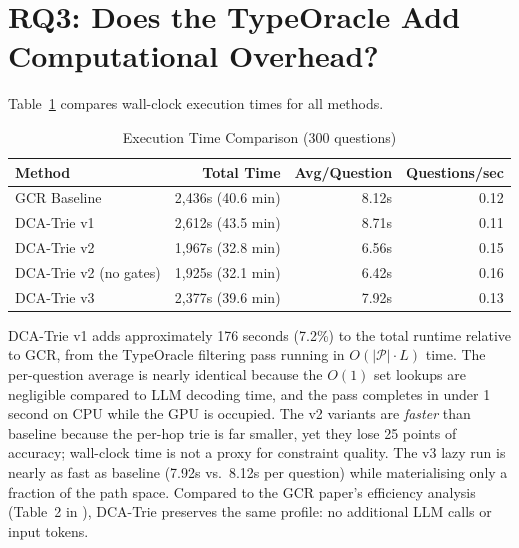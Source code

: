 \section{RQ3: Does the TypeOracle Add Computational Overhead?}
\label{sec:ch4timing}

Table~\ref{tab:timing} compares wall-clock execution times for all methods.

\begin{table}[H]
  \centering
  \caption[Execution Time by Method]{Execution Time Comparison (300 questions)}
  \label{tab:timing}
  \begin{tabularx}{\textwidth}{|X|r|r|r|}
    \hline
    \textbf{Method} & \textbf{Total Time} & \textbf{Avg/Question} & \textbf{Questions/sec} \\
    \hline
    GCR Baseline    & 2,436s (40.6 min)   & 8.12s                 & 0.12                   \\
    \hline
    DCA-Trie v1     & 2,612s (43.5 min)   & 8.71s                 & 0.11                   \\
    \hline
    DCA-Trie v2     & 1,967s (32.8 min)   & 6.56s                 & 0.15                   \\
    \hline
    DCA-Trie v2 (no gates) & 1,925s (32.1 min) & 6.42s             & 0.16                   \\
    \hline
    DCA-Trie v3     & 2,377s (39.6 min)   & 7.92s                 & 0.13                   \\
    \hline
  \end{tabularx}
\end{table}

DCA-Trie v1 adds approximately 176 seconds (7.2\%) to the total runtime relative to GCR, from the TypeOracle filtering pass running in $O(|\mathcal{P}| \cdot L)$ time. The per-question average is nearly identical because the $O(1)$ set lookups are negligible compared to LLM decoding time, and the pass completes in under 1 second on CPU while the GPU is occupied. The v2 variants are \textit{faster} than baseline because the per-hop trie is far smaller, yet they lose 25 points of accuracy; wall-clock time is not a proxy for constraint quality. The v3 lazy run is nearly as fast as baseline (7.92s vs.\ 8.12s per question) while materialising only a fraction of the path space. Compared to the GCR paper's efficiency analysis (Table~2 in \citet{luo2025-graph-constrained-reasoning}), DCA-Trie preserves the same profile: no additional LLM calls or input tokens.

